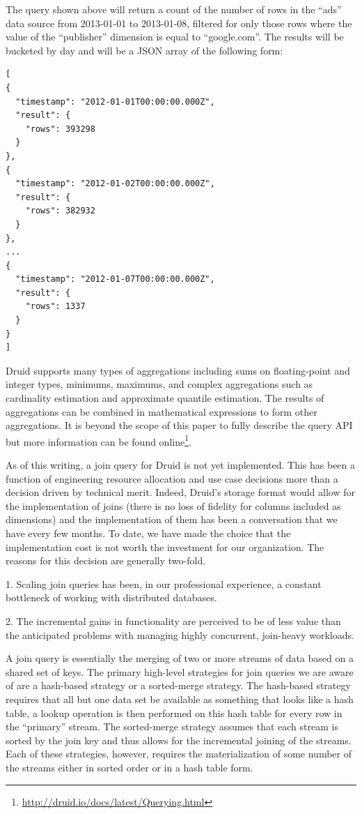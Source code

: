 \documentclass{vldb}
\begin{document}
The query shown above will return a count of the number of rows in the “ads”
data source from 2013-01-01 to 2013-01-08, filtered for only those rows where
the value of the “publisher” dimension is equal to “google.com”. The results
will be bucketed by day and will be a JSON array of the following form: 

{\scriptsize\begin{verbatim}
[
{
  "timestamp": "2012-01-01T00:00:00.000Z",
  "result": {
    "rows": 393298
  }
},
{
  "timestamp": "2012-01-02T00:00:00.000Z",
  "result": {
    "rows": 382932
  }
},
...
{
  "timestamp": "2012-01-07T00:00:00.000Z",
  "result": {
    "rows": 1337
  }
}
]
\end{verbatim}}

Druid supports many types of aggregations including sums on floating-point and
integer types, minimums, maximums, and complex aggregations such as cardinality
estimation and approximate quantile estimation. The results of aggregations can
be combined in mathematical expressions to form other aggregations. It is
beyond the scope of this paper to fully describe the query API but more
information can be found
online\footnote{\href{http://druid.io/docs/latest/Querying.html}{http://druid.io/docs/latest/Querying.html}}. 

As of this writing, a join query for Druid is not yet implemented. This has
been a function of engineering resource allocation and use case decisions more
than a decision driven by technical merit. Indeed, Druid’s storage format would
allow for the implementation of joins (there is no loss of fidelity for columns
included as dimensions) and the implementation of them has been a conversation
that we have every few months. To date, we have made the choice that the
implementation cost is not worth the investment for our organization. The
reasons for this decision are generally two-fold. 

1. Scaling join queries has been, in our professional experience, a constant
bottleneck of working with distributed databases. 

2. The incremental gains in functionality are perceived to be of less value
than the anticipated problems with managing highly concurrent, join-heavy
workloads. 

A join query is essentially the merging of two or more streams of data based on
a shared set of keys. The primary high-level strategies for join queries we are
aware of are a hash-based strategy or a sorted-merge strategy. The hash-based
strategy requires that all but one data set be available as something that
looks like a hash table, a lookup operation is then performed on this hash
table for every row in the “primary” stream. The sorted-merge strategy assumes
that each stream is sorted by the join key and thus allows for the incremental
joining of the streams. Each of these strategies, however, requires the
materialization of some number of the streams either in sorted order or in a
hash table form.
\end{document}
